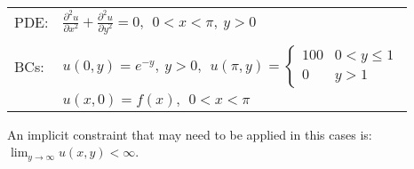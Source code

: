 \begin{table}
\begin{tabular}{l l}
PDE: & $\frac{\partial^2 u}{\partial x^2} + \frac{\partial^2 u}{\partial y^2} = 0, \ \ 0<x<\pi, \ y>0 $ \\
& \\
BCs: & $u(0,y) = e^{-y}, \ y>0, \ \ u(\pi,y) = \begin{cases} 100 & 0 < y \le 1 \\ 0 & y>1 \end{cases} $ \\
& $u(x,0) = f(x), \ \ 0<x<\pi $\\
\end{tabular}
\end{table}
An implicit constraint that may need to be applied in this cases is: $\lim_{y \to \infty} u(x,y) < \infty$. 
